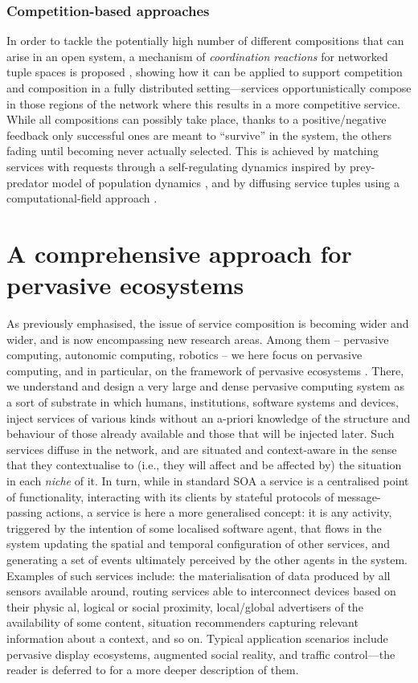 \documentclass[12pt,a4paper,twoside,openright]{book}
\begin{document}
\subsubsection{Competition-based approaches}
In order to tackle the potentially high number of different compositions that can arise in an open system, a mechanism of \emph{coordination reactions} for networked tuple spaces is proposed \cite{Viroli:11:SOACCPS}, showing how it can be applied to support competition and composition in a fully distributed setting---services opportunistically compose in those regions of the network where this results in a more competitive service.
%
While all compositions can possibly take place, thanks to a positive/negative feedback only successful ones are meant to ``survive'' in the system, the others fading until becoming never actually selected.
%
This is achieved by matching services with requests through a self-regulating dynamics inspired by prey-predator model of population dynamics \cite{Berryman:1992}, and by diffusing service tuples using a computational-field approach \cite{tota-aamas2005,proto}.



\section{A comprehensive approach for pervasive ecosystems}

As previously emphasised, the issue of service composition is becoming wider and wider, and is now encompassing new research areas.
%
Among them -- pervasive computing, autonomic computing, robotics -- we here focus on pervasive computing, and in particular, on the framework of pervasive ecosystems \cite{ecosystems-jpcc7}.
%
There, we understand and design a very large and dense pervasive computing system as a sort of substrate in which humans, institutions, software systems and devices, inject services of various kinds without an a-priori knowledge of the structure and behaviour of those already available and those that will be injected later.
%
Such services diffuse in the network, and are situated and context-aware in the sense that they contextualise to (i.e., they will affect and be affected by) the situation in each \emph{niche} of it.
%
In turn, while in standard SOA a service is a centralised point of functionality, interacting with its clients by stateful protocols of message-passing actions, a service is here a more generalised concept: it is any activity, triggered by the intention of some localised software agent, that flows in the system updating the spatial and temporal configuration of other services, and generating a set of events ultimately perceived by the other agents in the system.
%
Examples of such services include: the materialisation of data produced by all sensors available around, routing services able to interconnect devices based on their physic	al, logical or social proximity, local/global advertisers of the availability of some content, situation recommenders capturing relevant information about a context, and so on.
%
Typical application scenarios include pervasive display ecosystems, augmented social reality, and traffic control---the reader is deferred to \cite{ecosystems-jpcc7} for a more deeper description of them.
\end{document}
